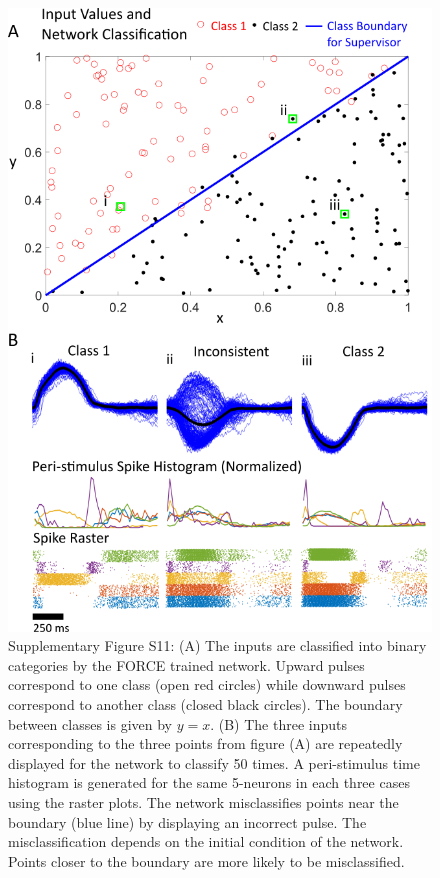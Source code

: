 \documentclass[11pt]{article} %
\begin{document}
\begin{figure}[htp!]
\centering
\includegraphics[scale=0.85]{FFIGS13}
\caption*{Supplementary Figure S11:  (A) The inputs are classified into binary categories by the FORCE trained network.  Upward pulses correspond to one class (open red circles) while downward pulses  correspond to another class (closed black circles).  The boundary between classes is given by $y=x$.  (B)  The three inputs corresponding to the three points from figure (A) are repeatedly displayed for the network to classify 50 times.  A peri-stimulus time histogram is generated for the same 5-neurons in each three cases using the raster plots.  The network misclassifies points near the boundary (blue line) by displaying an incorrect pulse.  The misclassification depends on the initial condition of the network.   Points closer to the boundary are more likely to be misclassified. }
\end{figure}
\end{document}
